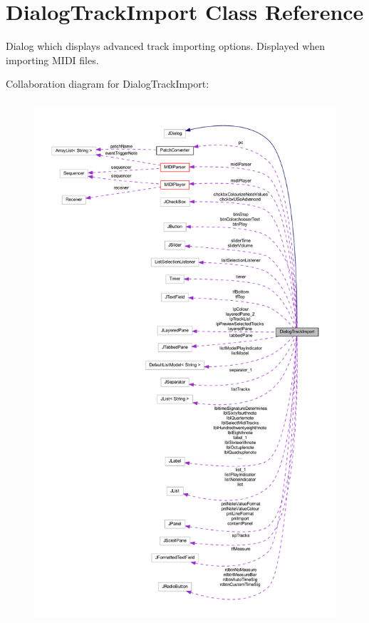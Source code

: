 \hypertarget{classcom_1_1lclion_1_1midigui_1_1_dialog_track_import}{\section{Dialog\+Track\+Import Class Reference}
\label{classcom_1_1lclion_1_1midigui_1_1_dialog_track_import}
}


Dialog which displays advanced track importing options. Displayed when importing M\+I\+D\+I files.  




Collaboration diagram for Dialog\+Track\+Import\+:\nopagebreak
\begin{figure}[H]
\begin{center}
\leavevmode
\includegraphics[height=550pt]{classcom_1_1lclion_1_1midigui_1_1_dialog_track_import__coll__graph}
\end{center}
\end{figure}
